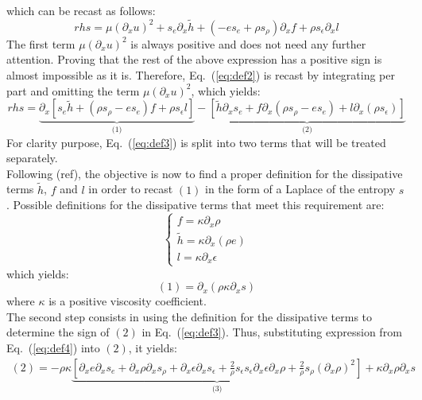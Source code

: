 \documentclass{article}
\newcommand{\eqt}[1]{Eq.~(\ref{#1})}                     %
\begin{document}
which can be recast as follows:
\begin{equation}
\label{eq:def2}
rhs = \mu \left( \partial_x u \right)^2  + s_e \partial_x \tilde{h}+ \left(-e s_e + \rho s_{\rho} \right) \partial_x f + \rho s_{\epsilon} \partial_x l
\end{equation}
The first term $\mu \left( \partial_x u \right)^2$ is always positive and does not need any further attention. Proving that the rest of the above expression has a positive sign is almost impossible as it is. Therefore, \eqt{eq:def2} is recast by integrating per part and omitting the term $\mu \left( \partial_x u \right)^2$, which yields:
\begin{equation}
\label{eq:def3}
rhs = \underbrace{\partial_x \left[ s_e \tilde{h} + \left( \rho s_{\rho} - e s_e \right) f + \rho s_{\epsilon} l \right]}_\text{(1)}  - \underbrace{\left[ \tilde{h} \partial_x s_e + f \partial_x \left(\rho s_{\rho} - e s_e\right) + l \partial_x \left( \rho s_{\epsilon} \right)\right]}_\text{(2)}
\end{equation}
For clarity purpose, \eqt{eq:def3} is split into two terms that will be treated separately. \\
Following (ref), the objective is now to find a proper definition for the dissipative terms $\tilde{h}$, $f$ and $l$ in order to recast $(1)$ in the form of a Laplace of the entropy $s$. Possible definitions for the dissipative terms that meet this requirement are: 
\begin{equation}
\boxed{
\left\{
\begin{array}{lll}
\label{eq:def4}
f = \kappa \partial_x \rho  \\
\tilde{h} = \kappa \partial_x \left( \rho e \right) \\
l = \kappa \partial_x \epsilon 
\end{array} \right.
} 
\end{equation}
which yields:
\begin{equation}
(1) = \partial_x \left( \rho \kappa \partial_x s \right) 
\end{equation}
where $\kappa$ is a positive viscosity coefficient. \\
The second step consists in using the definition for the dissipative terms to determine the sign of $(2)$ in \eqt{eq:def3}. Thus, substituting expression from \eqt{eq:def4} into $(2)$, it yields:
\begin{eqnarray}
\label{eq:def5}
(2) = -\rho \kappa \underbrace{\left[ \partial_x e \partial_x s_e + \partial_x \rho \partial_x s_{\rho} + \partial_x \epsilon \partial_x s_{\epsilon} + \frac{2}{\rho} s_{\epsilon} s_{\epsilon} \partial_x \epsilon \partial_x \rho + \frac{2}{\rho}s_{\rho} \left( \partial_x \rho \right)^2  \right]}_\text{(3)}  + \kappa \partial_x \rho \partial_x s \nonumber
\end{eqnarray}
\end{document}
